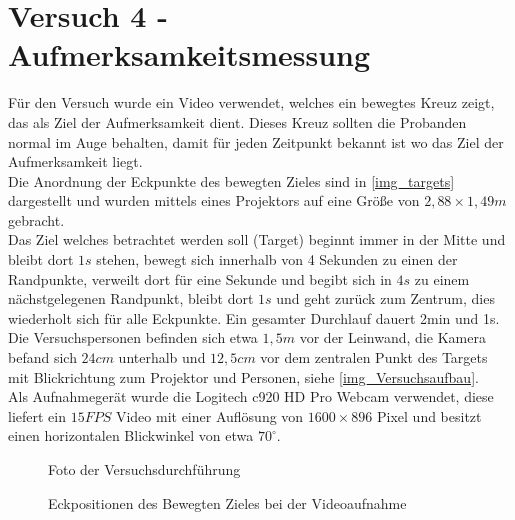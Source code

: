 \section{Versuch 4 - Aufmerksamkeitsmessung}
\label{VideoAnalyse}
Für den Versuch wurde ein Video verwendet, welches ein bewegtes Kreuz zeigt, das als Ziel der Aufmerksamkeit dient. Dieses Kreuz sollten die Probanden normal im Auge behalten, damit für jeden Zeitpunkt bekannt ist wo das Ziel der Aufmerksamkeit liegt.\\
Die Anordnung der Eckpunkte des bewegten Zieles sind in \autoref{img_targets} dargestellt und wurden mittels eines Projektors auf eine Größe von $2,88 \times 1,49 m$ gebracht.\\
Das Ziel welches betrachtet werden soll (Target) beginnt immer in der Mitte und bleibt dort $1s$ stehen, bewegt sich innerhalb von 4 Sekunden zu einen der Randpunkte, verweilt dort für eine Sekunde und begibt sich in $4s$ zu einem nächstgelegenen Randpunkt, bleibt dort $1s$ und geht zurück zum Zentrum, dies wiederholt sich für alle Eckpunkte. Ein gesamter Durchlauf dauert 2min und 1s.\\
Die Versuchspersonen befinden sich etwa $1,5m$ vor der Leinwand, die Kamera befand sich $24cm$ unterhalb und $12,5cm$ vor dem zentralen Punkt des Targets mit Blickrichtung zum Projektor und Personen, siehe \autoref{img_Versuchsaufbau}.\\
Als Aufnahmegerät wurde die Logitech c920 HD Pro Webcam verwendet, diese liefert ein $15FPS$ Video mit einer Auflösung von $1600\times 896$ Pixel und besitzt einen horizontalen Blickwinkel von etwa $70^\circ$.\\
\begin{figure}
	\centering
	\caption{Foto der Versuchsdurchführung}
	\label{img_Versuchsaufbau}
\end{figure}
\begin{figure}
\centering
{}
\caption{Eckpositionen des Bewegten Zieles bei der Videoaufnahme}
\label{img_targets}
\end{figure}
